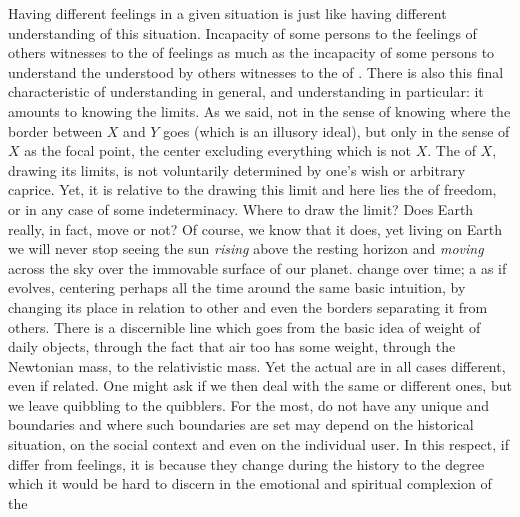 Having different feelings in a given situation is just like having different
understanding of this situation. Incapacity of some persons to  the
feelings of others witnesses to the  of feelings as much as
the incapacity of some persons to understand the  understood by
others witnesses to the  of .  There is also this
final characteristic of understanding in general, and 
understanding in particular: it amounts to knowing the limits. As we said, not
in the sense of knowing  where the border between $X$ and $Y$ goes
(which is an illusory ideal), but only in the sense of  $X$ as
the focal point, the center excluding everything which is not $X$. The
 of $X$, drawing its limits, is not voluntarily determined by
one's wish or arbitrary caprice. Yet, it is relative to the 
drawing this limit and here lies the  of freedom, or in any case of
some indeterminacy. Where to draw the limit? Does Earth really, in fact, move or
not? Of course, we know that it does, yet living on Earth we will never stop
seeing the sun {\em rising} above the resting horizon and {\em moving} across
the sky over the immovable surface of our planet.   change over
time; a  as if evolves, centering perhaps all the time around the
same basic intuition, by changing its place in relation to other 
and even the borders separating it from others. There is a discernible line
which goes from the basic idea of weight of daily objects, through the fact
that air too has some weight, through the Newtonian mass, to the relativistic
mass. Yet the actual  are in all cases different, even if
 related. One might ask if we then deal with the same 
or different ones, but we leave quibbling to the quibblers. For the most,
 do not have any unique and  boundaries and where such
boundaries are set may depend on the historical situation, on the social context
and even on the individual user.   In this respect, if  differ from
feelings, it is because they change during the history to the degree which it
would be hard to discern in the emotional and spiritual complexion of the
